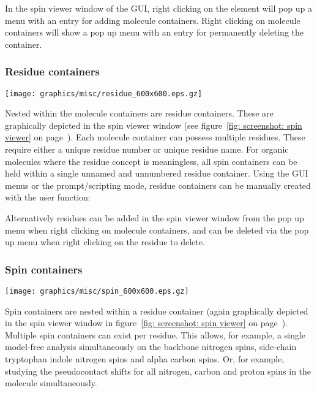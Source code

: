 
In the spin viewer window of the GUI, right clicking on the  element will pop up a menu with an entry for adding molecule containers.  Right clicking on molecule containers will show a pop up menu with an entry for permanently deleting the container.



\subsubsection{Residue containers}

\begin{figure*}[h]
\texttt{[image: graphics/misc/residue\_600x600.eps.gz]}
\end{figure*}

Nested within the molecule containers are residue containers.  These are graphically depicted in the spin viewer window (see figure~\ref{fig: screenshot: spin viewer} on page~\pageref{fig: screenshot: spin viewer}).  Each molecule container can possess multiple residues.  These require either a unique residue number or unique residue name.  For organic molecules where the residue concept is meaningless, all spin containers can be held within a single unnamed and unnumbered residue container.  Using the GUI menus or the prompt/scripting mode, residue containers can be manually created with the user function:


Alternatively residues can be added in the spin viewer window from the pop up menu when right clicking on molecule containers, and can be deleted via the pop up menu when right clicking on the residue to delete.



\newpage
\subsubsection{Spin containers}

\begin{figure*}[h]
\texttt{[image: graphics/misc/spin\_600x600.eps.gz]}
\end{figure*}

Spin containers are nested within a residue container (again graphically depicted in the spin viewer window in figure~\ref{fig: screenshot: spin viewer} on page~\pageref{fig: screenshot: spin viewer}).  Multiple spin containers can exist per residue.  This allows, for example, a single model-free analysis simultaneously on the backbone nitrogen spins, side-chain tryptophan indole nitrogen spins and alpha carbon spins.  Or, for example, studying the pseudocontact shifts for all nitrogen, carbon and proton spins in the molecule simultaneously.

